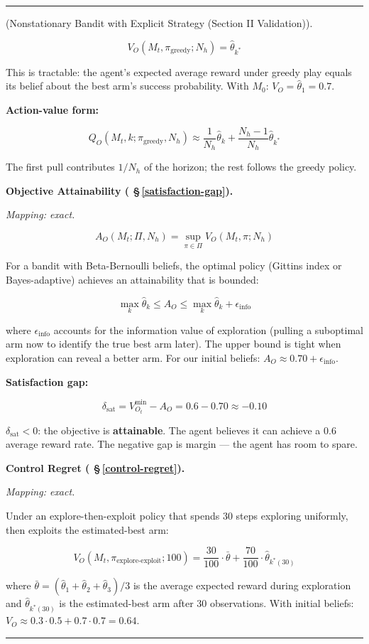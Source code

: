 \documentclass[11pt,oneside]{article}
\newcounter{claim}[section]
\renewcommand{\theclaim}{\thesection.\arabic{claim}}
\newenvironment{segment}[2]{%
  \refstepcounter{claim}%
  \bigskip\noindent\hrule\smallskip
  \noindent{\bfseries #1~\theclaim}\enskip(#2).\par\smallskip
  \noindent\ignorespaces
}{%
  \par\smallskip\noindent\hrule\bigskip
}
\newenvironment{remark}[1][]{\begin{segment}{Remark}{#1}}{\end{segment}}
\begin{document}
\begin{remark}[Nonstationary Bandit with Explicit Strategy (Section II Validation)]
$$V_O(M_t, \pi_\text{greedy}; N_h) = \hat\theta_{k^*}$$

This is tractable: the agent's expected average reward under greedy play equals its belief about the best arm's success probability. With $M_0$: $V_O = \hat\theta_1 = 0.7$.

\textbf{Action-value form:}

$$Q_O(M_t, k; \pi_\text{greedy}, N_h) \approx \frac{1}{N_h}\hat\theta_k + \frac{N_h - 1}{N_h}\hat\theta_{k^*}$$

The first pull contributes $1/N_h$ of the horizon; the rest follows the greedy policy.


\medskip\noindent\textbf{Objective Attainability ( \S\,\ref{satisfaction-gap}).}


\textit{Mapping: exact.}

$$A_O(M_t; \Pi, N_h) = \sup_{\pi \in \Pi} V_O(M_t, \pi; N_h)$$

For a bandit with Beta-Bernoulli beliefs, the optimal policy (Gittins index or Bayes-adaptive) achieves an attainability that is bounded:

$$\max_k \hat\theta_k \leq A_O \leq \max_k \hat\theta_k + \epsilon_\text{info}$$

where $\epsilon_\text{info}$ accounts for the information value of exploration (pulling a suboptimal arm now to identify the true best arm later). The upper bound is tight when exploration can reveal a better arm. For our initial beliefs: $A_O \approx 0.70 + \epsilon_\text{info}$.

\textbf{Satisfaction gap:}

$$\delta_\text{sat} = V_{O_t}^{\min} - A_O = 0.6 - 0.70 \approx -0.10$$

$\delta_\text{sat} < 0$: the objective is \textbf{attainable}. The agent believes it can achieve a $0.6$ average reward rate. The negative gap is margin — the agent has room to spare.


\medskip\noindent\textbf{Control Regret ( \S\,\ref{control-regret}).}


\textit{Mapping: exact.}

Under an explore-then-exploit policy that spends 30 steps exploring uniformly, then exploits the estimated-best arm:

$$V_O(M_t, \pi_\text{explore-exploit}; 100) = \frac{30}{100}\cdot\bar\theta + \frac{70}{100}\cdot\hat\theta_{k^*\!(30)}$$

where $\bar\theta = (\hat\theta_1 + \hat\theta_2 + \hat\theta_3)/3$ is the average expected reward during exploration and $\hat\theta_{k^*\!(30)}$ is the estimated-best arm after 30 observations. With initial beliefs: $V_O \approx 0.3 \cdot 0.5 + 0.7 \cdot 0.7 = 0.64$.


\end{remark}
\end{document}
